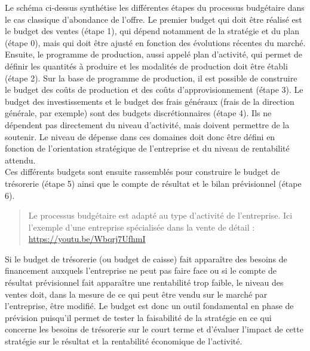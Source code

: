 \documentclass{kaobook}
\begin{document}
Le schéma ci-dessus synthétise les différentes étapes du processus budgétaire dans le cas classique d'abondance de l'offre. Le premier budget qui doit être réalisé est le budget des ventes (étape 1), qui dépend notamment de la stratégie et du plan (étape 0), mais qui doit être ajusté en fonction des évolutions récentes du marché. Ensuite, le programme de production, aussi appelé plan d'activité, qui permet de définir les quantités à produire et les modalités de production doit être établi (étape 2). Sur la base de programme de production, il est possible de construire le budget des coûts de production et des coûts d'approvisionnement (étape 3). Le budget des investissements et le budget des frais généraux (frais de la direction générale, par exemple) sont des budgets discrétionnaires (étape 4). Ils ne dépendent pas directement du niveau d'activité, mais doivent permettre de la soutenir. Le niveau de dépense dans ces domaines doit donc être défini en fonction de l'orientation stratégique de l'entreprise et du niveau de rentabilité attendu.\\
Ces différents budgets sont ensuite rassemblés pour construire le budget de trésorerie (étape 5) ainsi que le compte de résultat et le bilan prévisionnel (étape 6).\\

\begin{quote}
Le processus budgétaire est adapté au type d'activité de l'entreprise. Ici l'exemple d'une entreprise spécialisée dans la vente de détail :\\
\url{https://youtu.be/Wbqrj7UfhmI}\\
\end{quote}

Si le budget de trésorerie (ou budget de caisse) fait apparaître des besoins de financement auxquels l'entreprise ne peut pas faire face ou si le compte de résultat prévisionnel fait apparaître une rentabilité trop faible, le niveau des ventes doit, dans la mesure de ce qui peut être vendu sur le marché par l'entreprise, être modifié. Le budget est donc un outil fondamental en phase de prévision puisqu'il permet de tester la faisabilité de la stratégie en ce qui concerne les besoins de trésorerie sur le court terme et d'évaluer l'impact de cette stratégie sur le résultat et la rentabilité économique de l'activité.\\
\end{document}
